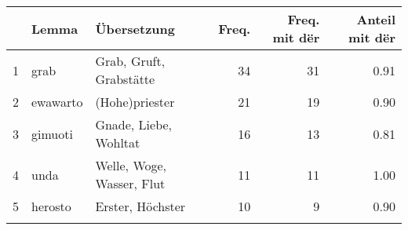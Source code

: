 \begin{tabular}{rllrrr}
  \lsptoprule
 & Lemma & Übersetzung & Freq. & Freq. mit dër & Anteil mit dër \\ 
  \midrule
1 & grab & Grab, Gruft, Grabstätte &  34 &  31 & 0.91 \\ 
  2 & ewawarto & (Hohe)priester &  21 &  19 & 0.90 \\ 
  3 & gimuoti & Gnade, Liebe, Wohltat &  16 &  13 & 0.81 \\ 
  4 & unda & Welle, Woge, Wasser, Flut &  11 &  11 & 1.00 \\ 
  5 & herosto & Erster, Höchster &  10 &   9 & 0.90 \\ 
   \lspbottomrule
\end{tabular}
